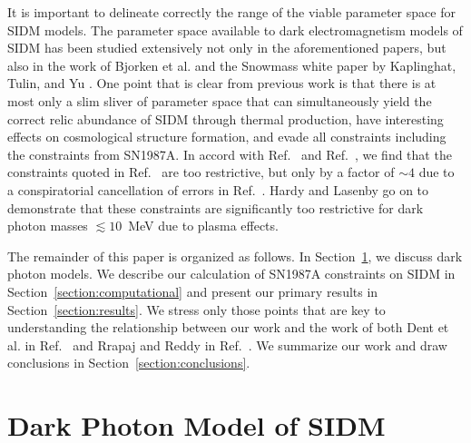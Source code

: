 \documentclass[nofootinbib,prd,superscriptaddress,twocolumn]{revtex4}
\begin{document}
It is important to delineate correctly the range of the viable parameter space for SIDM models. 
The parameter space available to dark electromagnetism models of SIDM has been studied extensively 
not only in the aforementioned papers, but also in the work of Bjorken et al. \cite{bjorken_etal09} and 
the Snowmass white paper by Kaplinghat, Tulin, and Yu \cite{kaplinghat_etal13_whitepaper}. One 
point that is clear from previous work is that there is at most only a slim sliver of parameter space that 
can simultaneously yield the correct relic abundance of SIDM through thermal production, 
have interesting effects on cosmological structure formation, and 
evade all constraints including the constraints from SN1987A. 
In accord with Ref.~\cite{rrapaj_reddy16} and Ref.~\cite{hardy_lasenby17}, we find that 
the constraints quoted in Ref.~\cite{dent_etal12} are too restrictive, but only by a factor 
of $\sim 4$ due to a conspiratorial cancellation of errors in Ref.~\cite{dent_etal12}. 
Hardy and Lasenby go on to demonstrate that these constraints are significantly too 
restrictive for dark photon masses $\lesssim 10$~MeV due to plasma effects.


The remainder of this paper is organized as follows. In Section~\ref{section:model}, we discuss 
dark photon models. We describe our calculation of SN1987A constraints on SIDM in 
Section~\ref{section:computational} and present our primary results in Section~\ref{section:results}. 
We stress only those points that are key to understanding the relationship between our work 
and the work of both Dent et al. in Ref.~\cite{dent_etal12} and Rrapaj and Reddy in Ref.~\cite{rrapaj_reddy16}. 
We summarize our work and draw conclusions in Section~\ref{section:conclusions}. 


\section{Dark Photon Model of SIDM}
\label{section:model}
\end{document}
